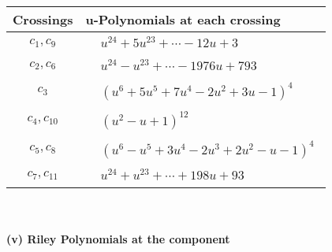 \documentclass[1p]{elsarticle_modified}
\theoremstyle{definition}
\begin{document}
\begin{tabular}{m{50pt}|m{274pt}}
Crossings & \hspace{64pt}u-Polynomials at each crossing \\
\hline $$\begin{aligned}c_{1},c_{9}\end{aligned}$$&$\begin{aligned}
&u^{24}+5 u^{23}+\cdots-12 u+3
\end{aligned}$\\
\hline $$\begin{aligned}c_{2},c_{6}\end{aligned}$$&$\begin{aligned}
&u^{24}- u^{23}+\cdots-1976 u+793
\end{aligned}$\\
\hline $$\begin{aligned}c_{3}\end{aligned}$$&$\begin{aligned}
&(u^6+5 u^5+7 u^4-2 u^2+3 u-1)^4
\end{aligned}$\\
\hline $$\begin{aligned}c_{4},c_{10}\end{aligned}$$&$\begin{aligned}
&(u^2- u+1)^{12}
\end{aligned}$\\
\hline $$\begin{aligned}c_{5},c_{8}\end{aligned}$$&$\begin{aligned}
&(u^6- u^5+3 u^4-2 u^3+2 u^2- u-1)^4
\end{aligned}$\\
\hline $$\begin{aligned}c_{7},c_{11}\end{aligned}$$&$\begin{aligned}
&u^{24}+u^{23}+\cdots+198 u+93
\end{aligned}$\\
\hline
\end{tabular}\\~\\
\newpage\renewcommand{\arraystretch}{1}
\flushleft \textbf{(v) Riley Polynomials at the component}\newline \\
\end{document}
